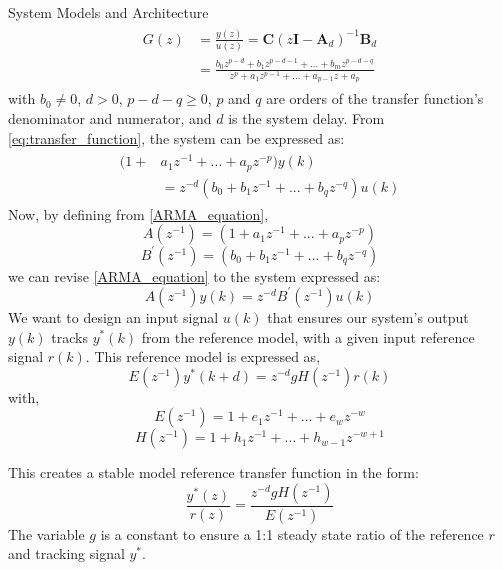\begin{section}{System Models and Architecture}
	\begin{align}
	\begin{split}
	\label{eq:transfer_function}
        G(z) & = \frac{y(z)}{u(z)} = \bm{C}(z\bm{I}-\bm{A}_d)^{-1}\bm{B}_d  \\
	& = \frac{b_0z^{p-d}+b_1z^{p-d-1} +...+b_mz^{p-d-q}}{z^{p}+a_1z^{p-1}+...+a_{p-1}z+a_p} 
	\end{split}
	\end{align}
with $b_0\ne{0}$, $d>0$, $p-d-q\geq{0}$, $p$ and $q$ are orders of the transfer function's denominator and numerator, and $d$ is the system delay. From \eqref{eq:transfer_function}, the system can be expressed as:
    \begin{align}
    \begin{split}
    \label{ARMA_equation}
	(1+&a_1z^{-1}+...+a_pz^{-p})y(k) \\
	&=z^{-d}(b_0+b_1z^{-1}+...+b_qz^{-q})u(k)
	\end{split}
	\end{align}
Now, by defining from \eqref{ARMA_equation}, 
	\begin{equation}
	\label{eq:A_q}
	A(z^{-1})=(1+a_1z^{-1}+...+a_pz^{-p})
	\end{equation}
	\begin{equation}
	\label{eq:B_prime}
	B^{'}(z^{-1})=(b_0+b_1z^{-1}+...+b_qz^{-q})
	\end{equation}
we can revise \eqref{ARMA_equation} to the system expressed as:
	\begin{equation}
	\label{eq:ARMA_equation_revise}
	A(z^{-1})y(k)=z^{-d}B^{'}(z^{-1})u(k)
	\end{equation}
We want to design an input signal $u(k)$ that ensures our system's output $y(k)$ tracks $y^*(k)$ from the reference model, with a given input reference signal $r(k)$. This reference model is expressed as,
	\begin{equation}
	\label{eq:reference model_q}
	E(z^{-1})y^*(k+d)=z^{-d}gH(z^{-1})r(k)
	\end{equation}
with,
    \begin{equation}
    \label{eq:E_q}
	E(z^{-1})=1+e_1z^{-1}+ \dots +e_wz^{-w}
	\end{equation}
	\begin{equation}
	H(z^{-1})=1+h_1z^{-1}+ \dots +h_{w-1}z^{-w+1}
	\end{equation}




This creates a stable model reference transfer function in the form:
	\begin{equation}
	\label{eq:reference model_z}
	\frac{y^*(z)}{r(z)}=\frac{z^{-d}gH(z^{-1})}{E(z^{-1})}
	\end{equation}
The variable $g$ is a constant to ensure a 1:1 steady state ratio of the reference $r$ and tracking signal $y^*$. 



\end{section}
